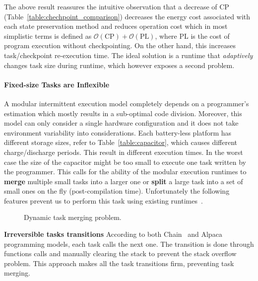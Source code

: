 The above result reassures the intuitive observation that a decrease of CP
(Table~\ref{table:chechpoint_comparison}) decreases the energy cost associated
with each state preservation method and reduces operation cost which in most
simplistic terms is defined as $\mathcal{O}(\text{CP})+\mathcal{O}(\text{PL})$,
where PL is the cost of program execution without checkpointing. On the other
hand, this increases task/checkpoint re-execution time. The ideal solution is a
runtime that \emph{adaptively} changes task size during runtime, which however
exposes a second problem.

\paragraph{Fixed-size Tasks are Inflexible}
A modular intermittent execution model completely depends on a programmer's
estimation which mostly results in a sub-optimal code division. Moreover, this
model can only consider a single hardware configuration and it does not take
environment variability into considerations. Each battery-less platform has
different storage sizes, refer to Table~\ref{table:capacitor}, which causes
different charge/discharge periods. This result in different execution times.
In the worst case the size of the capacitor might be too small to execute one
task written by the programmer. This calls for the ability of the modular
execution runtimes to \textbf{merge} multiple small tasks into a larger one or
\textbf{split} a large task into a set of small ones on the fly
(post-compilation time). Unfortunately the following features prevent us to
perform this task using existing runtimes~\cite{chain,alpaca}.

\begin{figure}
	\centering
	\caption{Dynamic task merging problem.}
	\label{fig:DynamicChainSeq}
\end{figure}

	\textbf{Irreversible tasks transitions} According to both Chain~\cite{chain} and Alpaca~\cite{alpaca} programming models, each task calls the next one. The transition is done through functions calls and manually clearing the stack to prevent the stack overflow problem. This approach makes all the task transitions firm, preventing task merging.

